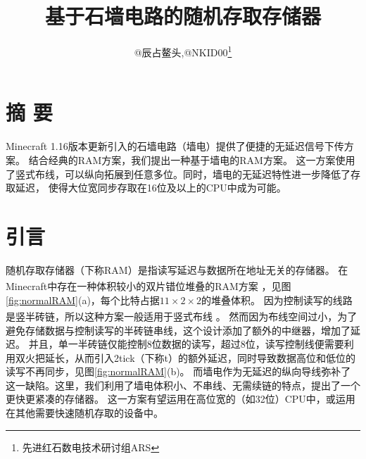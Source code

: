 \documentclass[UTF8,12pt,punct=kaiming,fontset=none]{article}
\title{\vspace{-1.5cm}基于石墙电路的随机存取存储器\vspace{-0.5cm}}
\author{@辰占鳌头,@NKID00\thanks{先进红石数电技术研讨组ARS}}
\date{}
\newcommand*{\upcite}[1]{
    \textsuperscript{\cite{#1}}
}
\begin{document}
\maketitle
    \thispagestyle{fancy} %
    \vspace{-0.7cm}

    \begin{minipage}[c]{0.75\linewidth}
        \titleformat{\section}[wrap]{\sffamily\small\bfseries}{}{0cm}{}
        \titlespacing{\section}{2cm}{1ex}{0.4cm}

        \section{摘 \hspace{0.11cm} 要}
        \small Minecraft 1.16版本更新引入的石墙电路（墙电）提供了便捷的无延迟信号下传方案。
        结合经典的RAM方案，我们提出一种基于墙电的RAM方案。
        这一方案使用了竖式布线，可以纵向拓展到任意多位。同时，墙电的无延迟特性进一步降低了存取延迟，
        使得大位宽同步存取在16位及以上的CPU中成为可能。

    \end{minipage}
    \vspace{0.2cm}

    \titleformat{\section}[hang]{\large\sffamily\bfseries}{\textmd{\thesection}}{0.5cm}{}
    \titlespacing{\section}{0cm}{0.5ex}{0.2ex}
    \setcounter{section}{0}

\section{引言}
随机存取存储器（下称RAM）是指读写延迟与数据所在地址无关的存储器。
在Minecraft中存在一种体积较小的双片错位堆叠的RAM方案\upcite{ORE}，见图\ref{fig:normalRAM}(a)，每个比特占据$11\times 2\times 2$的堆叠体积。
因为控制读写的线路是竖半砖链，所以这种方案一般适用于竖式布线\upcite{Vertical}。
然而因为布线空间过小，为了避免存储数据与控制读写的半砖链串线，这个设计添加了额外的中继器，增加了延迟。
并且，单一半砖链仅能控制8位数据的读写，超过8位，读写控制线便需要利用双火把延长，从而引入2tick（下称t）的额外延迟，同时导致数据高位和低位的读写不再同步，见图\ref{fig:normalRAM}(b)。
而墙电作为无延迟的纵向导线弥补了这一缺陷。这里，我们利用了墙电体积小、不串线、无需续链的特点，提出了一个更快更紧凑的存储器。
这一方案有望运用在高位宽的（如32位）CPU中，或运用在其他需要快速随机存取的设备中。
\end{document}

